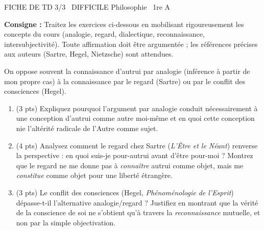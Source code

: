 \documentclass[11pt]{article}
\begin{document}
\begin{tcolorbox}[enhanced,colback=popink,colframe=popink,arc=10pt,boxrule=0pt,left=12pt,right=12pt,top=9pt,bottom=9pt]
{\color{white}\popxbold\small FICHE DE TD 3/3 \textbullet\ DIFFICILE \hfill Philosophie \textbullet\ 1re A\par}
\end{tcolorbox}
\vspace{4pt}
\noindent \textbf{Consigne :} Traitez les exercices ci-dessous en mobilisant rigoureusement les concepts du cours (analogie, regard, dialectique, reconnaissance, intersubjectivité). Toute affirmation doit être argumentée ; les références précises aux auteurs (Sartre, Hegel, Nietzsche) sont attendues.

\begin{exercice}
On oppose souvent la connaissance d'autrui par \og analogie \fg (inférence à partir de mon propre cas) à la connaissance par le \og regard \fg (Sartre) ou par le \og conflit des consciences \fg (Hegel).
\begin{enumerate}
    \item (3 pts) Expliquez pourquoi l'argument par analogie conduit nécessairement à une conception d'autrui comme \og autre moi-même \fg et en quoi cette conception nie l'altérité radicale de l'Autre comme sujet.
    \item (4 pts) Analysez comment le \og regard \fg chez Sartre (\textit{L'Être et le Néant}) renverse la perspective : en quoi suis-je \og pour-autrui \fg avant d'être \og pour-moi \fg ? Montrez que le regard ne me donne pas à \textit{connaître} autrui comme objet, mais me \textit{constitue} comme objet pour une liberté étrangère.
    \item (3 pts) Le \og conflit des consciences \fg (Hegel, \textit{Phénoménologie de l'Esprit}) dépasse-t-il l'alternative analogie/regard ? Justifiez en montrant que la vérité de la conscience de soi ne s'obtient qu'à travers la \textit{reconnaissance} mutuelle, et non par la simple objectivation.
\end{enumerate}
\end{exercice}
\end{document}
